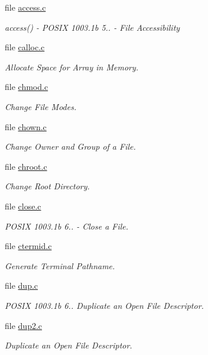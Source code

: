 \begin{DoxyCompactItemize}
file \mbox{\hyperlink{access_8c}{access.\+c}}
\begin{DoxyCompactList}\small\item\em access() -\/ P\+O\+S\+IX 1003.\+1b 5.. -\/ File Accessibility \end{DoxyCompactList}\item 
file \mbox{\hyperlink{calloc_8c}{calloc.\+c}}
\begin{DoxyCompactList}\small\item\em Allocate Space for Array in Memory. \end{DoxyCompactList}\item 
file \mbox{\hyperlink{chmod_8c}{chmod.\+c}}
\begin{DoxyCompactList}\small\item\em Change File Modes. \end{DoxyCompactList}\item 
file \mbox{\hyperlink{chown_8c}{chown.\+c}}
\begin{DoxyCompactList}\small\item\em Change Owner and Group of a File. \end{DoxyCompactList}\item 
file \mbox{\hyperlink{chroot_8c}{chroot.\+c}}
\begin{DoxyCompactList}\small\item\em Change Root Directory. \end{DoxyCompactList}\item 
file \mbox{\hyperlink{close_8c}{close.\+c}}
\begin{DoxyCompactList}\small\item\em P\+O\+S\+IX 1003.\+1b 6.. -\/ Close a File. \end{DoxyCompactList}\item 
file \mbox{\hyperlink{ctermid_8c}{ctermid.\+c}}
\begin{DoxyCompactList}\small\item\em Generate Terminal Pathname. \end{DoxyCompactList}\item 
file \mbox{\hyperlink{dup_8c}{dup.\+c}}
\begin{DoxyCompactList}\small\item\em P\+O\+S\+IX 1003.\+1b 6.. Duplicate an Open File Descriptor. \end{DoxyCompactList}\item 
file \mbox{\hyperlink{dup2_8c}{dup2.\+c}}
\begin{DoxyCompactList}\small\item\em Duplicate an Open File Descriptor. \end{DoxyCompactList}\item 

\end{DoxyCompactItemize}
